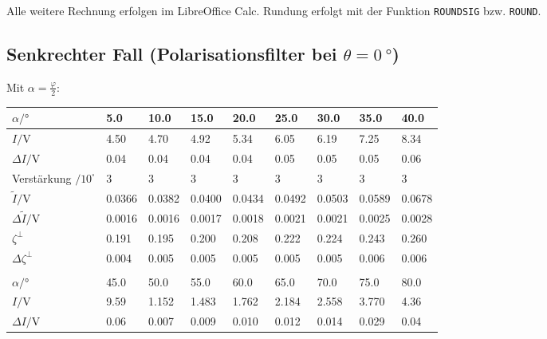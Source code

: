 	Alle weitere Rechnung erfolgen im LibreOffice Calc. Rundung erfolgt mit der Funktion \texttt{ROUNDSIG} bzw. \texttt{ROUND}. 

	\subsection{Senkrechter Fall (Polarisationsfilter bei $\theta = \SI{0}{\degree}$)}
		Mit $\alpha = \frac{\varphi}{2}$:
		\begin{center}
			\begin{tabular}{@{} l  *{8}{l} @{}}
				\toprule
				$\alpha/\si{\degree}$        & \num{5.0} & \num{10.0} & \num{15.0} & \num{20.0} & \num{25.0} & \num{30.0} & \num{35.0} & \num{40.0} \\
				\midrule
				$I/\si{\volt}$               & \num{4.50} & \num{4.70} & \num{4.92} & \num{5.34} & \num{6.05} & \num{6.19} & \num{7.25} & \num{8.34} \\
				$\Delta I/\si{\volt}$        & \num{0.04} & \num{0.04} & \num{0.04} & \num{0.04} & \num{0.05} & \num{0.05} & \num{0.05} & \num{0.06} \\
				Verstärkung $/10^\square$    & \num{3} & \num{3} & \num{3} & \num{3} & \num{3} & \num{3} & \num{3} & \num{3} \\
				$\tilde{I}/\si{\volt}$       & \num{0.0366} & \num{0.0382} & \num{0.0400} & \num{0.0434} & \num{0.0492} & \num{0.0503} & \num{0.0589} & \num{0.0678} \\
				$\Delta\tilde{I}/\si{\volt}$ & \num{0.0016} & \num{0.0016} & \num{0.0017} & \num{0.0018} & \num{0.0021} & \num{0.0021} & \num{0.0025} & \num{0.0028} \\
				\midrule
				$\zeta^{\bot}$               & \num{0.191} & \num{0.195} & \num{0.200} & \num{0.208} & \num{0.222} & \num{0.224} & \num{0.243} & \num{0.260} \\
				$\Delta\zeta^{\bot}$         & \num{0.004} & \num{0.005} & \num{0.005} & \num{0.005} & \num{0.005} & \num{0.005} & \num{0.006} & \num{0.006} \\
				\bottomrule
				\\[-0.5em]
				\toprule
				$\alpha/\si{\degree}$        & \num{45.0} & \num{50.0} & \num{55.0} & \num{60.0} & \num{65.0} & \num{70.0} & \num{75.0} & \num{80.0} \\
				\midrule
				$I/\si{\volt}$               & \num{9.59} & \num{1.152} & \num{1.483} & \num{1.762} & \num{2.184} & \num{2.558} & \num{3.770} & \num{4.36} \\
				$\Delta I/\si{\volt}$        & \num{0.06} & \num{0.007} & \num{0.009} & \num{0.010} & \num{0.012} & \num{0.014} & \num{0.029} & \num{0.04} \\

\end{tabular}
\end{center}
